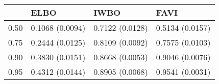 \begin{tabular}{llll}
\toprule
{} &             ELBO &             IWBO &             FAVI \\
\midrule
0.50 &  0.1068 (0.0094) &  0.7122 (0.0128) &  0.5134 (0.0157) \\
0.75 &  0.2444 (0.0125) &  0.8109 (0.0092) &  0.7575 (0.0103) \\
0.90 &  0.3830 (0.0151) &  0.8668 (0.0053) &  0.9046 (0.0076) \\
0.95 &  0.4312 (0.0144) &  0.8905 (0.0068) &  0.9541 (0.0031) \\
\bottomrule
\end{tabular}

